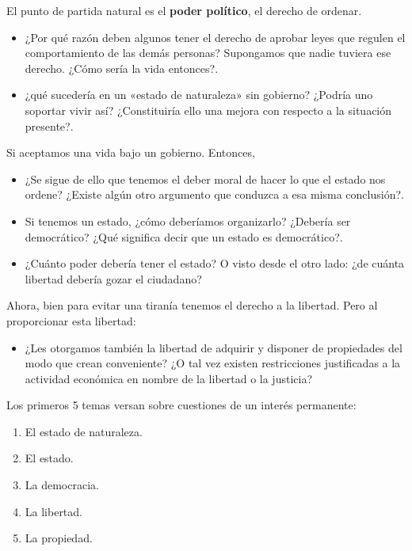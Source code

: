 El punto de partida natural es el \textbf{poder político}, el derecho de ordenar.

{\color{blue}
\begin{itemize}
    \item ¿Por qué razón deben algunos tener el derecho de aprobar leyes que regulen el comportamiento de las demás personas? Supongamos que nadie tuviera ese derecho. ¿Cómo sería la vida entonces?.
    \item ¿qué sucedería en un «estado de naturaleza» sin gobierno? ¿Podría uno soportar vivir así? ¿Constituiría ello una mejora con respecto a la situación presente?.
\end{itemize}
}

Si aceptamos una vida bajo un gobierno. Entonces,

{\color{blue}
\begin{itemize}
    \item ¿Se sigue de ello que tenemos el deber moral de hacer lo que el estado nos ordene? ¿Existe algún otro argumento que conduzca a esa misma conclusión?.
    \item Si tenemos un estado, ¿cómo deberíamos organizarlo? ¿Debería ser democrático? ¿Qué significa decir que un estado es democrático?.
    \item ¿Cuánto poder debería tener el estado? O visto desde el otro lado: ¿de cuánta libertad debería gozar el ciudadano?
\end{itemize}
}

Ahora, bien para evitar una tiranía tenemos el derecho a la libertad. Pero al proporcionar esta libertad:

{\color{blue}
\begin{itemize}
    \item ¿Les otorgamos también la libertad de adquirir y disponer de propiedades del modo que crean conveniente? ¿O tal vez existen restricciones justificadas a la actividad económica en nombre de la libertad o la justicia?
\end{itemize}
}

Los primeros 5 temas versan sobre cuestiones de un interés permanente:

\begin{enumerate}[\bfseries 1.]
    \item El estado de naturaleza.
    \item El estado.
    \item La democracia.
    \item La libertad.
    \item La propiedad.
\end{enumerate}

